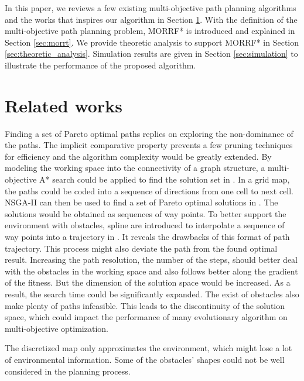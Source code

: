 \documentclass[conference]{IEEEtran}
\begin{document}
In this paper, we reviews a few existing multi-objective path planning algorithms and the works that inspires our algorithm in Section \ref{sec:related_works}.
With the definition of the multi-objective path planning problem, MORRF* is introduced and explained in Section \ref{sec:morrt}.
We provide theoretic analysis to support MORRF* in Section \ref{sec:theoretic_analysis}.
Simulation results are given in Section \ref{sec:simulation} to illustrate the performance of the proposed algorithm.

\section{Related works}
\label{sec:related_works}

Finding a set of Pareto optimal paths replies on exploring the non-dominance of the paths.
The implicit comparative property prevents a few pruning techniques for efficiency and the algorithm complexity would be greatly extended.
By modeling the working space into the connectivity of a graph structure, a multi-objective A* search could be applied to find the solution set in \cite{Mandow:2005:NAM:1642293.1642328}.
In a grid map, the paths could be coded into a sequence of directions from one cell to next cell.
NSGA-II can then be used to find a set of Pareto optimal solutions in \cite{Ahmed2013}.
The solutions would be obtained as sequences of way points.
To better support the environment with obstacles, spline are introduced to interpolate a sequence of way points into a trajectory in \cite{6181426}.
It reveals the drawbacks of this format of path trajectory. 
This process might also deviate the path from the found optimal result.
Increasing the path resolution, the number of the steps, should better deal with the obstacles in the working space and also follows better along the gradient of the fitness.
But the dimension of the solution space would be increased.
As a result, the search time could be significantly expanded.
The exist of obstacles also make plenty of paths infeasible.
This leads to the discontinuity of the solution space, which could impact the performance of many evolutionary algorithm on multi-objective optimization.

The discretized map only approximates the environment, which might lose a lot of environmental information.
Some of the obstacles' shapes could not be well considered in the planning process.
\end{document}
